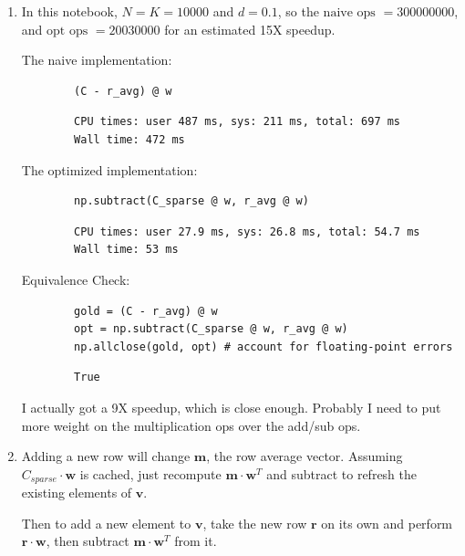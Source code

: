 \documentclass[11pt]{article}
\begin{document}
\begin{solution}
\begin{enumerate}
    \item In this notebook, $N = K = 10000$ and $d = 0.1$, so the $\text{naive ops } = 300000000$, and $\text{opt ops } = 20030000$ for an estimated 15X speedup.

    The naive implementation:
    \begin{verbatim}
        (C - r_avg) @ w
    \end{verbatim}
    \begin{verbatim}
        CPU times: user 487 ms, sys: 211 ms, total: 697 ms
        Wall time: 472 ms
    \end{verbatim}

    The optimized implementation:
    \begin{verbatim}
        np.subtract(C_sparse @ w, r_avg @ w)
    \end{verbatim}
    \begin{verbatim}
        CPU times: user 27.9 ms, sys: 26.8 ms, total: 54.7 ms
        Wall time: 53 ms
    \end{verbatim}

    Equivalence Check:
    \begin{verbatim}
        gold = (C - r_avg) @ w
        opt = np.subtract(C_sparse @ w, r_avg @ w)
        np.allclose(gold, opt) # account for floating-point errors
    \end{verbatim}
    \begin{verbatim}
        True
    \end{verbatim}

    I actually got a 9X speedup, which is close enough. Probably I need to put more weight on the multiplication ops over the add/sub ops.

    \item Adding a new row will change $\mathbf{m}$, the row average vector. Assuming $C_{sparse} \cdot \mathbf{w}$ is cached, just recompute $\mathbf{m} \cdot \mathbf{w}^T$ and subtract to refresh the existing elements of $\mathbf{v}$.

        Then to add a new element to $\mathbf{v}$, take the new row $\mathbf{r}$ on its own and perform $\mathbf{r} \cdot \mathbf{w}$, then subtract $\mathbf{m} \cdot \mathbf{w}^T$ from it.
\end{enumerate}
\end{solution}
\end{document}
